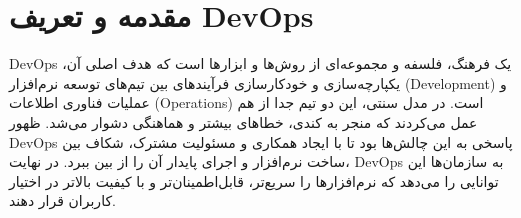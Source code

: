 \section{مقدمه و تعریف DevOps}
DevOps یک فرهنگ، فلسفه و مجموعه‌ای از روش‌ها و ابزارها است که هدف اصلی آن، یکپارچه‌سازی و خودکارسازی فرآیندهای بین تیم‌های توسعه نرم‌افزار (Development) و عملیات فناوری اطلاعات (Operations) است. در مدل سنتی، این دو تیم جدا از هم عمل می‌کردند که منجر به کندی، خطاهای بیشتر و هماهنگی دشوار می‌شد. ظهور DevOps پاسخی به این چالش‌ها بود تا با ایجاد همکاری و مسئولیت مشترک، شکاف بین ساخت نرم‌افزار و اجرای پایدار آن را از بین ببرد. در نهایت، DevOps به سازمان‌ها این توانایی را می‌دهد که نرم‌افزارها را سریع‌تر، قابل‌اطمینان‌تر و با کیفیت بالاتر در اختیار کاربران قرار دهند.

